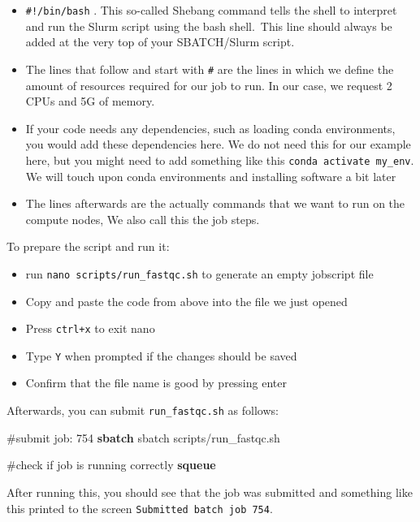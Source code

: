 \documentclass[
  letterpaper,
  DIV=11,
  numbers=noendperiod]{scrreprt}
\newenvironment{Shaded}{}{}
\newcommand{\CommentTok}[1]{\textcolor[rgb]{0.42,0.45,0.49}{#1}}
\newcommand{\ExtensionTok}[1]{\textcolor[rgb]{0.84,0.23,0.29}{\textbf{#1}}}
\newcommand{\NormalTok}[1]{\textcolor[rgb]{0.14,0.16,0.18}{#1}}
\providecommand{\tightlist}{%
  \setlength{\itemsep}{0pt}\setlength{\parskip}{0pt}}\usepackage{longtable,booktabs,array}
\begin{document}
\begin{itemize}
\item
  \texttt{\#!/bin/bash} . This so-called Shebang command tells the shell
  to interpret and run the Slurm script using the bash shell.~This line
  should always be added at the very top of your SBATCH/Slurm script.
\item
  The lines that follow and start with \texttt{\#} are the lines in
  which we define the amount of resources required for our job to run.
  In our case, we request 2 CPUs and 5G of memory.
\item
  If your code needs any dependencies, such as loading conda
  environments, you would add these dependencies here. We do not need
  this for our example here, but you might need to add something like
  this \texttt{conda\ activate\ my\_env}. We will touch upon conda
  environments and installing software a bit later
\item
  The lines afterwards are the actually commands that we want to run on
  the compute nodes, We also call this the job steps.
\end{itemize}

To prepare the script and run it:

\begin{itemize}
\tightlist
\item
  run \texttt{nano\ scripts/run\_fastqc.sh} to generate an empty
  jobscript file
\item
  Copy and paste the code from above into the file we just opened
\item
  Press \texttt{ctrl+x} to exit nano
\item
  Type \texttt{Y} when prompted if the changes should be saved
\item
  Confirm that the file name is good by pressing enter
\end{itemize}

Afterwards, you can submit \texttt{run\_fastqc.sh} as follows:

\begin{Shaded}
\begin{Highlighting}[]
\CommentTok{\#submit job: 754}
\ExtensionTok{sbatch}\NormalTok{ sbatch scripts/run\_fastqc.sh}

\CommentTok{\#check if job is running correctly}
\ExtensionTok{squeue}
\end{Highlighting}
\end{Shaded}

After running this, you should see that the job was submitted and
something like this printed to the screen
\texttt{Submitted\ batch\ job\ 754}.
\end{document}
